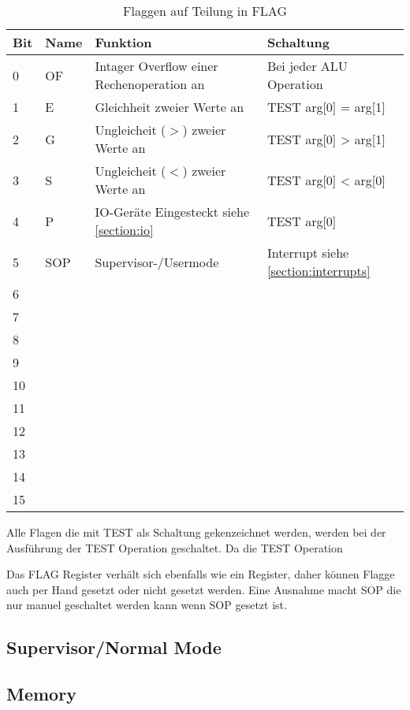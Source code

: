 \documentclass{scrartcl}
\begin{document}
\begin{center}
	\begin{table}[h]
		\caption{\label{table:flag}Flaggen auf Teilung in FLAG}
		\begin{tabular}{l | l | l | l}
			Bit & Name & Funktion & Schaltung \\
			\hline
			 0 & OF  & Intager Overflow einer Rechenoperation an & Bei jeder ALU Operation\\
			 1 & E   & Gleichheit zweier Werte an & TEST arg[0] = arg[1]\\
			 2 & G   & Ungleicheit ($>$) zweier Werte an & TEST arg[0] > arg[1]\\
			 3 & S   & Ungleicheit ($<$) zweier Werte an & TEST arg[0] < arg[0]\\
			 4 & P   & IO-Geräte Eingesteckt siehe \ref{section:io} & TEST arg[0]\\
			 5 & SOP & Supervisor-/Usermode & Interrupt siehe \ref{section:interrupts} \\
			 6 &  &  &  \\
			 7 &  &  &  \\
			 8 &  &  &  \\
			 9 &  &  &  \\
			10 &  &  &  \\
			11 &  &  &  \\
			12 &  &  &  \\
			13 &  &  &  \\
			14 &  &  &  \\
			15 &  &  & 
		\end{tabular}
	\end{table}
\end{center}

Alle Flagen die mit TEST als Schaltung gekenzeichnet werden, werden bei der Ausführung der TEST Operation geschaltet. Da die TEST Operation 

Das FLAG Register verhält sich ebenfalls wie ein Register, daher können Flagge auch per Hand gesetzt oder nicht gesetzt werden. Eine Ausnahme macht SOP die nur manuel geschaltet werden kann wenn SOP gesetzt ist.



\subsection{\label{section:supervisor}Supervisor/Normal Mode}

\subsection{\label{section:memory}Memory}
\end{document}
